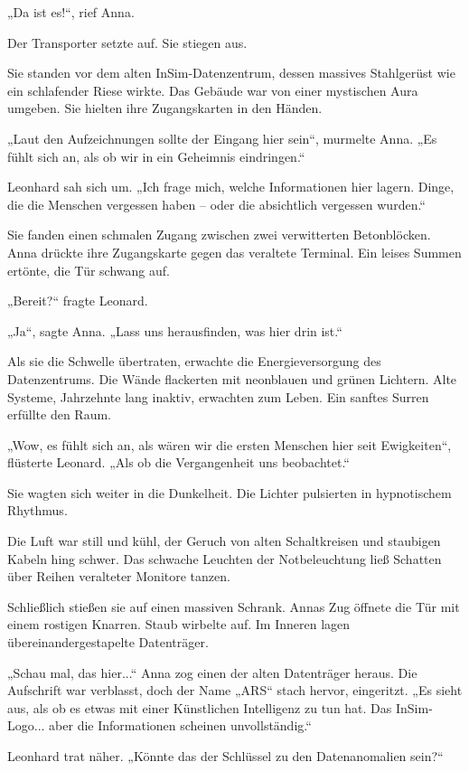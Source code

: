 \documentclass[
]{article}
\begin{document}
„Da ist es!{\kern0pt}``, rief Anna.

Der Transporter setzte auf. Sie stiegen aus.

Sie standen vor dem alten InSim-Datenzentrum, dessen massives Stahlgerüst wie ein schlafender Riese wirkte. Das Gebäude war von einer mystischen Aura umgeben. Sie hielten ihre Zugangskarten in den Händen.

„Laut den Aufzeichnungen sollte der Eingang hier sein``, murmelte Anna. „Es fühlt sich an, als ob wir in ein Geheimnis eindringen.``

Leonhard sah sich um. „Ich frage mich, welche Informationen hier lagern. Dinge, die die Menschen vergessen haben -- oder die absichtlich vergessen wurden.``

Sie fanden einen schmalen Zugang zwischen zwei verwitterten Betonblöcken. Anna drückte ihre Zugangskarte gegen das veraltete Terminal. Ein leises Summen ertönte, die Tür schwang auf.

„Bereit?{\kern0pt}`` fragte Leonard.

„Ja``, sagte Anna. „Lass uns herausfinden, was hier drin ist.``

Als sie die Schwelle übertraten, erwachte die Energieversorgung des Datenzentrums. Die Wände flackerten mit neonblauen und grünen Lichtern. Alte Systeme, Jahrzehnte lang inaktiv, erwachten zum Leben. Ein sanftes Surren erfüllte den Raum.

„Wow, es fühlt sich an, als wären wir die ersten Menschen hier seit Ewigkeiten``, flüsterte Leonard. „Als ob die Vergangenheit uns beobachtet.``

Sie wagten sich weiter in die Dunkelheit. Die Lichter pulsierten in hypnotischem Rhythmus.

Die Luft war still und kühl, der Geruch von alten Schaltkreisen und staubigen Kabeln hing schwer. Das schwache Leuchten der Notbeleuchtung ließ Schatten über Reihen veralteter Monitore tanzen.

Schließlich stießen sie auf einen massiven Schrank. Annas Zug öffnete die Tür mit einem rostigen Knarren. Staub wirbelte auf. Im Inneren lagen übereinandergestapelte Datenträger.

„Schau mal, das hier...`` Anna zog einen der alten Datenträger heraus. Die Aufschrift war verblasst, doch der Name „ARS`` stach hervor, eingeritzt. „Es sieht aus, als ob es etwas mit einer Künstlichen Intelligenz zu tun hat. Das InSim-Logo... aber die Informationen scheinen unvollständig.``

Leonhard trat näher. „Könnte das der Schlüssel zu den Datenanomalien sein?{\kern0pt}``
\end{document}
